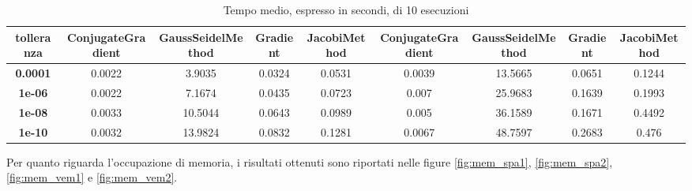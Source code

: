 \begin{table}[!ht]
\begin{subtable}[!ht]{1\textwidth}
{\begin{tabular}{@{}ccccc|cccc@{}}
                \textbf{tolleranza}        &
                \textbf{ConjugateGradient} &
                \textbf{GaussSeidelMethod} &
                \textbf{Gradient}          &
                \textbf{JacobiMethod}      &
                \textbf{ConjugateGradient} &
                \textbf{GaussSeidelMethod} &
                \textbf{Gradient}          &
                \textbf{JacobiMethod}                                                                                                                                      \\ \midrule
                \textbf{0.0001}            & 0.0022                             & 3.9035                            & 0.0324 & 0.0531 & 0.0039 & 13.5665 & 0.0651 & 0.1244 \\
                \textbf{1e-06}             & 0.0022                             & 7.1674                            & 0.0435 & 0.0723 & 0.007  & 25.9683 & 0.1639 & 0.1993 \\
                \textbf{1e-08}             & 0.0033                             & 10.5044                           & 0.0643 & 0.0989 & 0.005  & 36.1589 & 0.1671 & 0.4492 \\
                \textbf{1e-10}             & 0.0032                             & 13.9824                           & 0.0832 & 0.1281 & 0.0067 & 48.7597 & 0.2683 & 0.476  \\ \bottomrule
            \end{tabular}}
        \caption{Vem 1 e Vem 2}
        \label{tab:vem_time}
    \end{subtable}
    \caption{Tempo medio, espresso in secondi, di 10 esecuzioni}
    \label{tab:times}
\end{table}

Per quanto riguarda l'occupazione di memoria, i risultati ottenuti sono riportati
nelle figure \ref{fig:mem_spa1}, \ref{fig:mem_spa2}, \ref{fig:mem_vem1} e \ref{fig:mem_vem2}.

